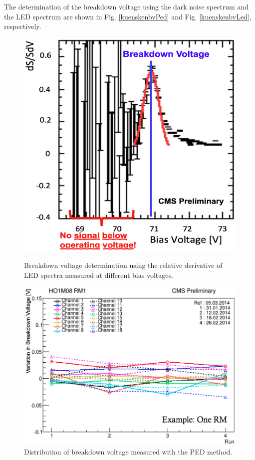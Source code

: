 The determination of the breakdown voltage using the dark noise spectrum and the LED spectrum are shown in Fig. \ref{kuenskenbvPed} and Fig. \ref{kuenskenbvLed}, respectively.
\begin{figure}[h]
\centering
\begin{minipage}[t]{0.39\textwidth}
\includegraphics[width=\textwidth]{Figures/kuensken/bvLedScaled.png}
\caption{Breakdown voltage determination using the relative derivative of LED spectra measured at different bias voltages.}
\label{kuenskenbvLed}
\end{minipage}
\hspace{0.5cm}
\begin{minipage}[t]{0.56\textwidth}
\includegraphics[width=\textwidth]{Figures/kuensken/bvOverTime.png}
\caption{Distribution of breakdown voltage measured with the PED method.}
\label{kuenskenbvVsTime}
\end{minipage}
\end{figure}
